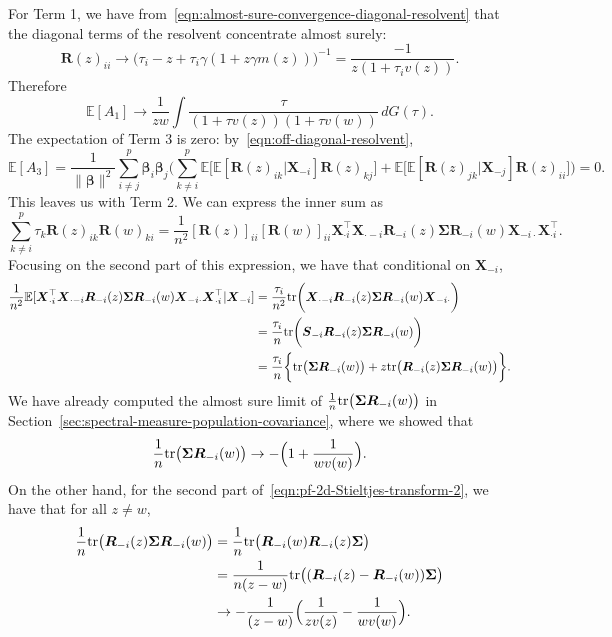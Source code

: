 \documentclass{article}
\newcommand{\bX}{\boldsymbol{X}}
\newcommand{\bbeta}{\boldsymbol{\beta}}
\newcommand{\bSigma}{\boldsymbol{\Sigma}}
\newcommand{\bS}{\boldsymbol{S}}
\newcommand{\bR}{\boldsymbol{R}}
\begin{document}
For Term 1, we have from~\eqref{eqn:almost-sure-convergence-diagonal-resolvent} that the diagonal terms of the resolvent concentrate almost surely:
$$
\bR(z)_{ii} \to \bigg(\tau_i - z + \tau_i \gamma(1 + z \gamma m(z))\bigg)^{-1} = \frac{-1}{z(1 + \tau_i v(z))}.
$$
Therefore
$$
\mathbb{E}[A_1] \to \frac{1}{zw} \int \frac{\tau}{(1 + \tau v(z))(1 + \tau v(w))} \,dG(\tau).
$$
The expectation of Term 3 is zero: by~\eqref{eqn:off-diagonal-resolvent},
\begin{equation*}
	\mathbb{E}[A_3] = \frac{1}{\|\bbeta\|^2} \sum_{i \neq j}^{p} \bbeta_i \bbeta_j \Big(\sum_{k \neq i}^{p} \mathbb{E}\Big[\mathbb{E}[\bR(z)_{ik}|\bX_{-i}] \bR(z)_{kj}\Big] + \mathbb{E}\Big[\mathbb{E}[\bR(z)_{jk}|\bX_{-j}] \bR(z)_{ii}\Big]\Big) = 0.
\end{equation*}
This leaves us with Term 2. We can express the inner sum as 
\begin{equation}
	\label{eqn:pf-2d-Stieltjes-transform-1}
	\sum_{k \neq i}^{p} \tau_k \bR(z)_{ik} \bR(w)_{ki} = \frac{1}{n^2}[\bR(z)]_{ii} [\bR(w)]_{ii} \bX_{\cdot i}^{\top} \bX_{\cdot -i} \bR_{-i}(z) \bSigma \bR_{-i}(w) \bX_{-i \cdot} \bX_{\cdot i}^{\top}.
\end{equation}
Focusing on the second part of this expression, we have that conditional on $\bX_{-i}$,
\begin{align}
	\label{eqn:pf-2d-Stieltjes-transform-2}
	\frac{1}{n^2}\mathbb{E}[\bX_{\cdot i}^{\top} \bX_{\cdot -i} \bR_{-i}(z) \bSigma \bR_{-i}(w) \bX_{-i \cdot} \bX_{\cdot i}^{\top}|\bX_{-i}] 
	& = \frac{\tau_i}{n^2} \tr\bigg(\bX_{\cdot -i} \bR_{-i}(z) \bSigma \bR_{-i}(w) \bX_{-i \cdot}\bigg) \nonumber \\
	& = \frac{\tau_i}{n} \tr\bigg(\bS_{-i} \bR_{-i}(z) \bSigma \bR_{-i}(w)\bigg) \nonumber \\
	& = \frac{\tau_i}{n}\bigg\{\tr\big(\bSigma \bR_{-i}(w)\big) + z \tr\big(\bR_{-i}(z) \bSigma \bR_{-i}(w) \big)\bigg\}.
\end{align}
We have already computed the almost sure limit of $\frac{1}{n}\tr\big(\bSigma \bR_{-i}(w)\big)$ in Section~\ref{sec:spectral-measure-population-covariance}, where we showed that 
\begin{equation*}
	\frac{1}{n}\tr\big(\bSigma \bR_{-i}(w)\big) \to -\Big(1 + \frac{1}{wv(w)}\Big).
\end{equation*}
On the other hand, for the second part of~\eqref{eqn:pf-2d-Stieltjes-transform-2}, we have that for all $z \neq w$,
\begin{align*}
	\frac{1}{n}\tr\big(\bR_{-i}(z) \bSigma \bR_{-i}(w) \big) 
	& = 
	\frac{1}{n}\tr\big(\bR_{-i}(w) \bR_{-i}(z) \bSigma \big) \\
	& = 
	\frac{1}{n(z - w)}\tr\big((\bR_{-i}(z)  - \bR_{-i}(w)) \bSigma \big) \\
	& \to -\frac{1}{(z - w)}\Big(\frac{1}{zv(z)} - \frac{1}{wv(w)}\Big).
\end{align*}
\end{document}

